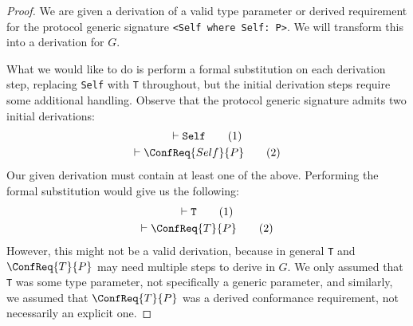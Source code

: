 \documentclass[../generics]{subfiles}
\begin{document}
\begin{proof}
We are given a derivation of a valid type parameter or derived requirement for the protocol generic signature \verb|<Self where Self: P>|. We will transform this into a derivation for $G$.

What we would like to do is perform a formal substitution on each derivation step, replacing \texttt{Self} with \texttt{T} throughout, but the initial derivation steps require some additional handling. Observe that the protocol generic signature admits two initial derivations:
\begin{gather}
\vdash \texttt{Self}\tag{1}\\
\vdash \ConfReq{Self}{P}\tag{2}
\end{gather}
Our given derivation must contain at least one of the above. Performing the formal substitution would give us the following:
\begin{gather}
\vdash \texttt{T}\tag{1}\\
\vdash \ConfReq{T}{P}\tag{2}
\end{gather}
However, this might not be a valid derivation, because in general \texttt{T} and $\ConfReq{T}{P}$ may need multiple steps to derive in $G$. We only assumed that \texttt{T} was some type parameter, not specifically a generic parameter, and similarly, we assumed that $\ConfReq{T}{P}$ was a derived conformance requirement, not necessarily an explicit one.


\end{proof}
\end{document}
